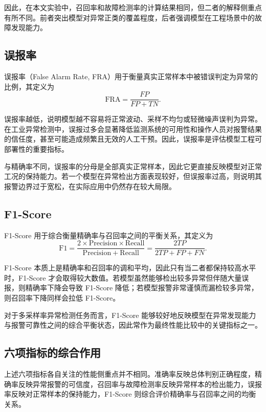 因此，在本文实验中，召回率和故障检测率的计算结果相同，但二者的解释侧重点有所不同。前者突出模型对异常正类的覆盖程度，后者强调模型在工程场景中的故障发现能力。

\subsection{误报率}

误报率（False Alarm Rate, FRA）用于衡量真实正常样本中被错误判定为异常的比例，其定义为
\begin{equation}
    \mathrm{FRA}
    =
    \frac{FP}{FP + TN}.
\end{equation}

误报率越低，说明模型越不容易将正常波动、采样不均匀或轻微噪声误判为异常。在工业异常检测中，误报过多会显著降低监测系统的可用性和操作人员对报警结果的信任度，甚至可能造成频繁且无效的人工干预。因此，误报率是评估模型工程可部署性的重要指标。

与精确率不同，误报率的分母是全部真实正常样本，因此它更直接反映模型对正常工况的保持能力。若一个模型在异常检出方面表现较好，但误报率过高，则说明其报警边界过于宽松，在实际应用中仍然存在较大局限。

\subsection{F1-Score}

F1-Score 用于综合衡量精确率与召回率之间的平衡关系，其定义为
\begin{equation}
    \mathrm{F1}
    =
    \frac{2 \times \mathrm{Precision} \times \mathrm{Recall}}
    {\mathrm{Precision} + \mathrm{Recall}}
    =
    \frac{2TP}{2TP + FP + FN}.
\end{equation}

F1-Score 本质上是精确率和召回率的调和平均，因此只有当二者都保持较高水平时，F1-Score 才会取得较大数值。若模型虽然能够检出较多异常但伴随大量误报，则精确率下降会导致 F1-Score 降低；若模型报警非常谨慎而漏检较多异常，则召回率下降同样会拉低 F1-Score。

对于多采样率异常检测任务而言，F1-Score 能够较好地反映模型在异常发现能力与报警可靠性之间的综合平衡状态，因此常作为最终性能比较中的关键指标之一。

\subsection{六项指标的综合作用}

上述六项指标各自关注的性能侧重点并不相同。准确率反映总体判别正确程度，精确率反映异常报警的可信度，召回率与故障检测率反映异常样本的检出能力，误报率反映对正常样本的保持能力，F1-Score 则综合评价精确率与召回率之间的均衡关系。

